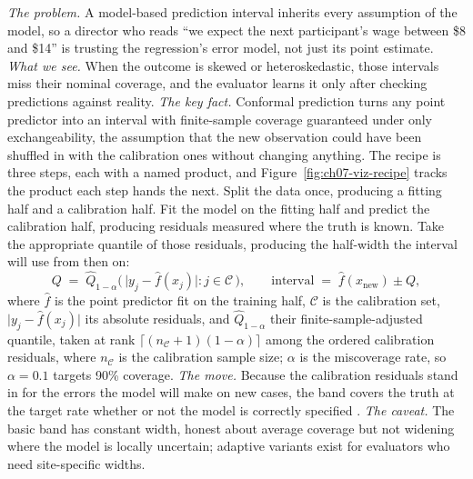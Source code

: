 \documentclass[
    a4paper,
    fontsize=10pt,
    twoside=true,
    numbers=noenddot,
]{kaobook}
\begin{document}
\emph{The problem.} A model-based prediction interval inherits every assumption of the model, so a director who reads \enquote{we expect the next participant's wage between \$8 and \$14} is trusting the regression's error model, not just its point estimate. \emph{What we see.} When the outcome is skewed or heteroskedastic, those intervals miss their nominal coverage, and the evaluator learns it only after checking predictions against reality. \emph{The key fact.} Conformal prediction \parencite{shafer2008tutorial,angelopoulos2023conformal} turns any point predictor into an interval with finite-sample coverage guaranteed under only exchangeability, the assumption that the new observation could have been shuffled in with the calibration ones without changing anything. The recipe is three steps, each with a named product, and Figure~\ref{fig:ch07-viz-recipe} tracks the product each step hands the next. Split the data once, producing a fitting half and a calibration half. Fit the model on the fitting half and predict the calibration half, producing residuals measured where the truth is known. Take the appropriate quantile of those residuals, producing the half-width the interval will use from then on:
\begin{equation}
  Q \;=\; \widehat{Q}_{1-\alpha}\!\bigl(\,\lvert y_j - \hat f(x_j)\rvert : j \in \mathcal{C}\,\bigr),
  \qquad
  \text{interval} \;=\; \hat f(x_{\text{new}}) \pm Q,
  \label{eq:ch07-viz-conformal}
\end{equation}
where $\hat f$ is the point predictor fit on the training half, $\mathcal{C}$ is the calibration set, $\lvert y_j-\hat f(x_j)\rvert$ its absolute residuals, and $\widehat{Q}_{1-\alpha}$ their finite-sample-adjusted quantile, taken at rank $\lceil(n_{\mathcal C}+1)(1-\alpha)\rceil$ among the ordered calibration residuals, where $n_{\mathcal C}$ is the calibration sample size; $\alpha$ is the miscoverage rate, so $\alpha=0.1$ targets 90\% coverage. \emph{The move.} Because the calibration residuals stand in for the errors the model will make on new cases, the band covers the truth at the target rate whether or not the model is correctly specified \parencite{lei2018distribution}. \emph{The caveat.} The basic band has constant width, honest about average coverage but not widening where the model is locally uncertain; adaptive variants exist for evaluators who need site-specific widths.
\end{document}
